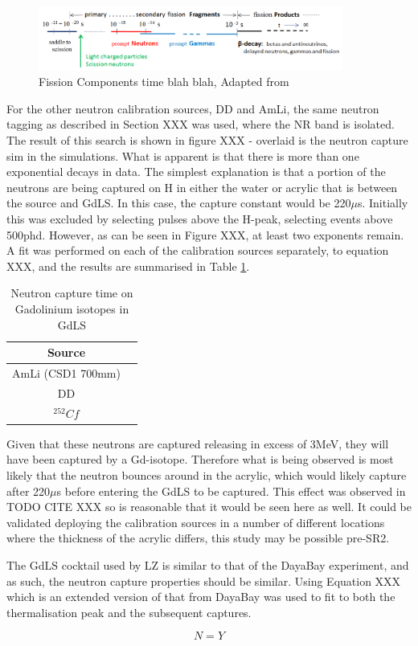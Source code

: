 \begin{figure}[!htbp]
\includegraphics[width=10cm]{Figures/NeutronCaptureTime/fission_fragment_times.png}
\centering
\caption{Fission Components time blah blah, Adapted from \cite{cf252_fission_ref}}
\label{fig:fission_fragments_time}
\end{figure}



\par
For the other neutron calibration sources, DD and AmLi, the same neutron tagging as described in Section XXX was used, where the NR band is isolated.
The result of this search is shown in figure XXX - overlaid is the neutron capture sim in the simulations.
What is apparent is that there is more than one exponential decays in data.
The simplest explanation is that a portion of the neutrons are being captured on H in either the water or acrylic that is between the source and GdLS.
In this case, the capture constant would be 220$\mu$s.
Initially this was excluded by selecting pulses above the H-peak, selecting events above 500phd.
However, as can be seen in Figure XXX, at least two exponents remain.
A fit was performed on each of the calibration sources separately, to equation XXX, and the results are summarised in Table \ref{tab:neutron_capture_times}.
\begin{table}[!htbp]
    \centering
    \begin{tabular}{c|c}
        Source            &  \\ \hline
        AmLi (CSD1 700mm) & \\ 
        DD                & \\
        ${}^{252}{Cf}$    &
    \end{tabular}
    \caption{Neutron capture time on Gadolinium isotopes in GdLS}
    \label{tab:neutron_capture_times}
\end{table}

Given that these neutrons are captured releasing in excess of 3MeV, they will have been captured by a Gd-isotope. 
Therefore what is being observed is most likely that the neutron bounces around in the acrylic, which would likely capture after 220$\mu$s before entering the GdLS to be captured.
This effect was observed in TODO CITE XXX so is reasonable that it would be seen here as well.
It could be validated deploying the calibration sources in a number of different locations where the thickness of the acrylic differs, this study may be possible pre-SR2.


\par
The GdLS cocktail used by LZ is similar to that of the DayaBay experiment, and as such, the neutron capture properties should be similar.
Using Equation XXX which is an extended version of that from DayaBay \cite{Dayabay_neutron_capture_fit_ref} was used to fit to both the thermalisation peak and the subsequent captures.

\begin{equation}
    N = Y
\end{equation}